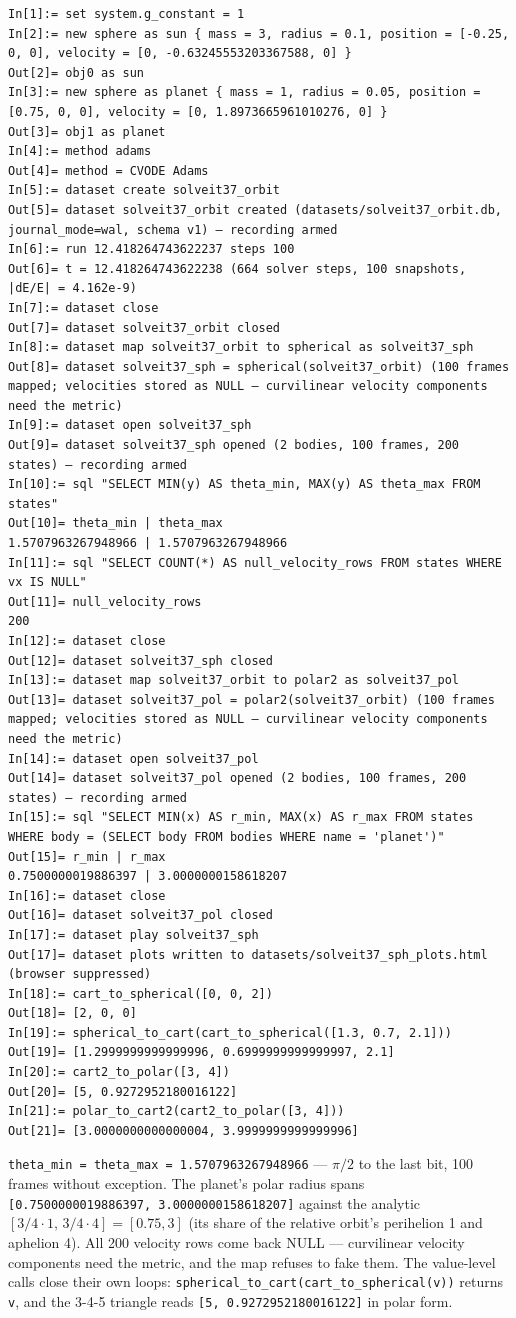 \documentclass[11pt]{article}
\newcommand{\code}[1]{\texttt{#1}}
\begin{document}
\begin{lstlisting}
In[1]:= set system.g_constant = 1
In[2]:= new sphere as sun { mass = 3, radius = 0.1, position = [-0.25, 0, 0], velocity = [0, -0.63245553203367588, 0] }
Out[2]= obj0 as sun
In[3]:= new sphere as planet { mass = 1, radius = 0.05, position = [0.75, 0, 0], velocity = [0, 1.8973665961010276, 0] }
Out[3]= obj1 as planet
In[4]:= method adams
Out[4]= method = CVODE Adams
In[5]:= dataset create solveit37_orbit
Out[5]= dataset solveit37_orbit created (datasets/solveit37_orbit.db, journal_mode=wal, schema v1) — recording armed
In[6]:= run 12.418264743622237 steps 100
Out[6]= t = 12.418264743622238 (664 solver steps, 100 snapshots, |dE/E| = 4.162e-9)
In[7]:= dataset close
Out[7]= dataset solveit37_orbit closed
In[8]:= dataset map solveit37_orbit to spherical as solveit37_sph
Out[8]= dataset solveit37_sph = spherical(solveit37_orbit) (100 frames mapped; velocities stored as NULL — curvilinear velocity components need the metric)
In[9]:= dataset open solveit37_sph
Out[9]= dataset solveit37_sph opened (2 bodies, 100 frames, 200 states) — recording armed
In[10]:= sql "SELECT MIN(y) AS theta_min, MAX(y) AS theta_max FROM states"
Out[10]= theta_min | theta_max
1.5707963267948966 | 1.5707963267948966
In[11]:= sql "SELECT COUNT(*) AS null_velocity_rows FROM states WHERE vx IS NULL"
Out[11]= null_velocity_rows
200
In[12]:= dataset close
Out[12]= dataset solveit37_sph closed
In[13]:= dataset map solveit37_orbit to polar2 as solveit37_pol
Out[13]= dataset solveit37_pol = polar2(solveit37_orbit) (100 frames mapped; velocities stored as NULL — curvilinear velocity components need the metric)
In[14]:= dataset open solveit37_pol
Out[14]= dataset solveit37_pol opened (2 bodies, 100 frames, 200 states) — recording armed
In[15]:= sql "SELECT MIN(x) AS r_min, MAX(x) AS r_max FROM states WHERE body = (SELECT body FROM bodies WHERE name = 'planet')"
Out[15]= r_min | r_max
0.7500000019886397 | 3.0000000158618207
In[16]:= dataset close
Out[16]= dataset solveit37_pol closed
In[17]:= dataset play solveit37_sph
Out[17]= dataset plots written to datasets/solveit37_sph_plots.html (browser suppressed)
In[18]:= cart_to_spherical([0, 0, 2])
Out[18]= [2, 0, 0]
In[19]:= spherical_to_cart(cart_to_spherical([1.3, 0.7, 2.1]))
Out[19]= [1.2999999999999996, 0.6999999999999997, 2.1]
In[20]:= cart2_to_polar([3, 4])
Out[20]= [5, 0.9272952180016122]
In[21]:= polar_to_cart2(cart2_to_polar([3, 4]))
Out[21]= [3.0000000000000004, 3.9999999999999996]
\end{lstlisting}

\code{theta\_min = theta\_max = 1.5707963267948966} --- $\pi/2$ to
the last bit, 100 frames without exception. The planet's polar
radius spans \code{[0.7500000019886397, 3.0000000158618207]} against
the analytic $[3/4 \cdot 1,\, 3/4 \cdot 4] = [0.75, 3]$ (its share of
the relative orbit's perihelion 1 and aphelion 4). All 200 velocity
rows come back NULL --- curvilinear velocity components need the
metric, and the map refuses to fake them. The value-level calls
close their own loops:
\code{spherical\_to\_cart(cart\_to\_spherical(v))} returns \code{v},
and the 3-4-5 triangle reads \code{[5, 0.9272952180016122]} in polar
form.
\end{document}

